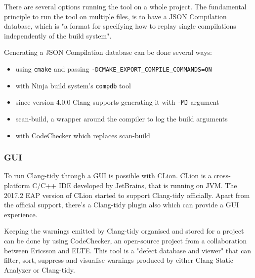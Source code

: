 \par There are several options running the tool on a whole project. The fundamental principle to run the tool on multiple files, is to have a JSON Compilation database, which is "a format for specifying how to replay single compilations independently of the build system"\cite{compilation_db}.
\par Generating a JSON Compilation database can be done several ways:
\begin{itemize}
    \item using \verb|cmake| and passing \verb|-DCMAKE_EXPORT_COMPILE_COMMANDS=ON|
    \item with Ninja build system's \verb|compdb| tool\cite{ninja_build_system}
    \item since version 4.0.0 Clang supports generating it with \verb|-MJ| argument\cite{clang_release_years}
    \item scan-build, a wrapper around the compiler to log the build arguments\cite{scan_build}
    \item with CodeChecker which replaces scan-build\cite{codechecker}
\end{itemize}
\subsubsection{GUI}
\par To run Clang-tidy through a GUI is possible with CLion. CLion is a cross-platform C/C++ IDE developed by JetBrains, that is running on JVM. The 2017.2 EAP version of CLion started to support Clang-tidy officially\cite{clion_tidy_eap}. Apart from the official support, there's a Clang-tidy plugin\cite{clion_tidy_plugin} also which can provide a GUI experience. \medskip
\par Keeping the warnings emitted by Clang-tidy organised and stored for a project can be done by using CodeChecker\cite{codechecker_gsd}, an open-source project from a collaboration between Ericsson and ELTE. This tool is a "defect database and viewer"\cite{codechecker} that can filter, sort, suppress and visualise warnings produced by either Clang Static Analyzer or Clang-tidy.
